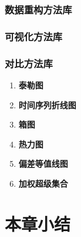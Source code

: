 \subsubsection{数据重构方法库}
\subsubsection{可视化方法库}
\subsubsection{对比方法库}
\begin{enumerate}[(1)]
\item \textbf{泰勒图}

\item \textbf{时间序列折线图}

\item \textbf{箱图}

\item \textbf{热力图}

\item \textbf{偏差等值线图}

\item \textbf{加权超级集合}

\end{enumerate}

\section{本章小结}